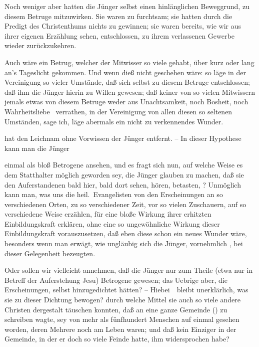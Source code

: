 \begin{aufza}
\begin{aufzb}
\begin{aufzc}
\item Noch weniger aber hatten die Jünger selbst einen hinlänglichen Beweggrund, zu diesem Betruge mitzuwirken. Sie waren zu furchtsam; sie hatten durch die Predigt des Christenthums nichts zu gewinnen; sie waren bereits, wie wir aus ihrer eigenen Erzählung sehen, entschlossen, zu ihrem verlassenen Gewerbe wieder zurückzukehren.
\item Auch wäre ein Betrug, welcher der Mitwisser so viele gehabt, über kurz oder lang an's Tageslicht gekommen. Und wenn dieß nicht geschehen wäre: so läge in der Vereinigung so vieler Umstände, daß sich  selbst zu diesem Betruge entschlossen; daß ihm die Jünger hierin zu Willen gewesen; daß keiner von so vielen Mitwissern jemals etwas von diesem Betruge weder aus Unachtsamkeit, noch Bosheit, noch Wahrheitsliebe \udgl\  verrathen, in der Vereinigung von allen diesen so seltenen Umständen, sage ich, läge abermals ein nicht zu verkennendes Wunder.
\end{aufzc}
\item {} hat den Leichnam ohne Vorwissen der Jünger entfernt. -- In dieser Hypothese kann man die Jünger
\begin{aufzc}
\item einmal als bloß Betrogene ansehen, und es fragt sich nun, auf welche Weise es dem Statthalter möglich geworden sey, die Jünger glauben zu machen, daß sie den Auferstandenen bald hier, bald dort sehen, hören, betasten, \usw ? Unmöglich kann man, was uns die heil.\ Evangelisten von den Erscheinungen  an so verschiedenen Orten, zu so verschiedener Zeit, vor so vielen Zuschauern, auf so verschiedene Weise erzählen, für eine bloße Wirkung ihrer erhitzten Einbildungskraft erklären, ohne eine so ungewöhnliche Wirkung dieser Einbildungskraft vorauszusetzen, daß eben diese schon ein neues Wunder wäre, besonders wenn man erwägt, wie ungläubig sich die Jünger, vornehmlich , bei dieser Gelegenheit bezeugten.
\item Oder sollen wir vielleicht annehmen, daß die Jünger nur zum Theile (etwa nur in Betreff der Auferstehung Jesu) Betrogene gewesen; das Uebrige aber, die Erscheinungen, selbst hinzugedichtet hätten? -- Hiebei~\ bleibt unerklärlich, was sie zu dieser Dichtung bewogen? durch welche Mittel sie auch so viele andere Christen dergestalt täuschen konnten, daß  an eine ganze Gemeinde () zu schreiben wagte,  sey von mehr als fünfhundert Menschen auf einmal gesehen worden, deren Mehrere noch am Leben waren; und daß kein Einziger in der Gemeinde, in der er doch so viele Feinde hatte, ihm widersprochen habe? \usw\

\end{aufzc}
\end{aufzb}
\end{aufza}
